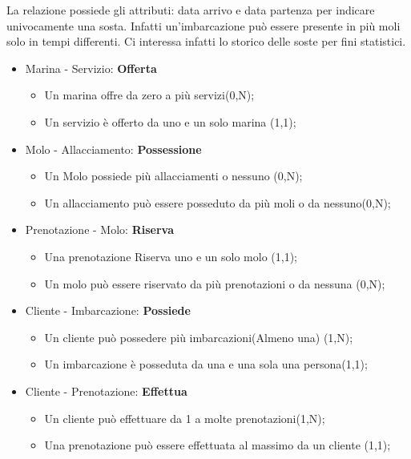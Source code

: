 La relazione possiede gli attributi: data arrivo e data partenza per indicare univocamente una sosta. Infatti un'imbarcazione può essere presente in più moli solo in tempi differenti. Ci interessa infatti lo storico delle soste per fini statistici.

\begin{itemize}
    
    \item Marina - Servizio: \textbf{Offerta}
    \begin{itemize}
        \item Un marina offre da zero a più servizi(0,N);
        \item Un servizio è offerto da uno e un solo marina (1,1);
    \end{itemize}
    
    \item Molo - Allacciamento: \textbf{Possessione}
    \begin{itemize}
        \item Un Molo possiede più allacciamenti o nessuno (0,N);
        \item Un allacciamento può essere posseduto da più moli o da nessuno(0,N);
    \end{itemize}
    
    \item Prenotazione - Molo: \textbf{Riserva}
    \begin{itemize}
        \item Una prenotazione Riserva uno e un solo molo (1,1);
        \item Un molo può essere riservato da più prenotazioni o da nessuna (0,N);
    \end{itemize}
    
    \item Cliente - Imbarcazione: \textbf{Possiede}
    \begin{itemize}
        \item Un cliente può possedere più imbarcazioni(Almeno una) (1,N);
        \item Un imbarcazione è posseduta da una e una sola una persona(1,1);
    \end{itemize}
    
    \item Cliente - Prenotazione: \textbf{Effettua}
    \begin{itemize}
        \item Un cliente può effettuare da 1 a molte prenotazioni(1,N);
        \item Una prenotazione può essere effettuata al massimo da un cliente (1,1);
    \end{itemize}
    

\end{itemize}
